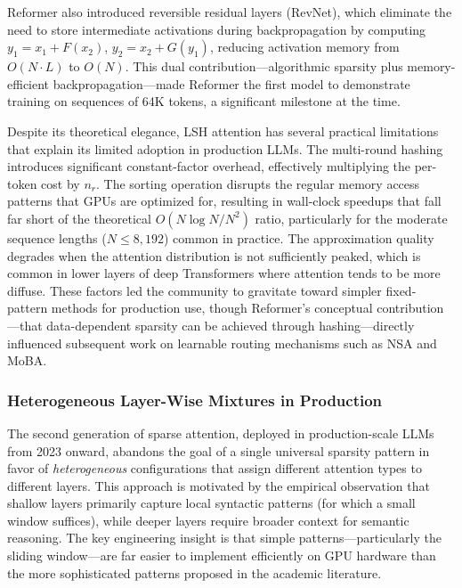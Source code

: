 Reformer also introduced reversible residual layers (RevNet), which eliminate the need
to store intermediate activations during backpropagation by computing
$y_1 = x_1 + F(x_2)$, $y_2 = x_2 + G(y_1)$, reducing activation memory from
$O(N \cdot L)$ to $O(N)$.
This dual contribution---algorithmic sparsity plus memory-efficient
backpropagation---made Reformer the first model to demonstrate training on sequences
of 64K tokens, a significant milestone at the time.

Despite its theoretical elegance, LSH attention has several practical limitations that explain its limited adoption in production LLMs. The multi-round hashing introduces significant constant-factor overhead, effectively multiplying the per-token cost by $n_r$. The sorting operation disrupts the regular memory access patterns that GPUs are optimized for, resulting in wall-clock speedups that fall far short of the theoretical $O(N \log N / N^2)$ ratio, particularly for the moderate sequence lengths ($N \leq 8{,}192$) common in practice. The approximation quality degrades when the attention distribution is not sufficiently peaked, which is common in lower layers of deep Transformers where attention tends to be more diffuse. These factors led the community to gravitate toward simpler fixed-pattern methods for production use, though Reformer's conceptual contribution---that data-dependent sparsity can be achieved through hashing---directly influenced subsequent work on learnable routing mechanisms such as NSA and MoBA.


\subsubsection{Heterogeneous Layer-Wise Mixtures in Production}
\label{subsubsec:heterogeneous-sparse}

The second generation of sparse attention, deployed in production-scale LLMs from 2023 onward, abandons the goal of a single universal sparsity pattern in favor of \emph{heterogeneous} configurations that assign different attention types to different layers. This approach is motivated by the empirical observation that shallow layers primarily capture local syntactic patterns (for which a small window suffices), while deeper layers require broader context for semantic reasoning. The key engineering insight is that simple patterns---particularly the sliding window---are far easier to implement efficiently on GPU hardware than the more sophisticated patterns proposed in the academic literature.

